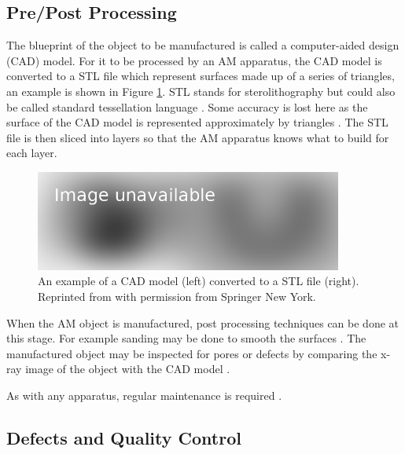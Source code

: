 \subsection{Pre/Post Processing}

The blueprint of the object to be manufactured is called a computer-aided design (CAD) model. For it to be processed by an AM apparatus, the CAD model is converted to a STL file \citep{3d1989sterolithography, 3d2019what} which represent surfaces made up of a series of triangles, an example is shown in Figure \ref{fig:literature_stl}. STL stands for sterolithography but could also be called standard tessellation language \citep{wong2012review}. Some accuracy is lost here as the surface of the CAD model is represented approximately by triangles \citep{gibson2010additive}. The STL file is then sliced into layers \citep{jamieson1995direct, vatani2009enhanced} so that the AM apparatus knows what to build for each layer.

\begin{figure}
  \centering
  \includegraphics[width=0.9\textwidth]{../figures/literatureReview/literature_stl.png}
  \caption{An example of a CAD model (left) converted to a STL file (right). Reprinted from \cite{gibson2010additive} with permission from Springer New York.}
  \label{fig:literature_stl}
\end{figure}

When the AM object is manufactured, post processing techniques can be done at this stage. For example sanding may be done to smooth the surfaces \citep{gibson2010additive}. The manufactured object may be inspected for pores or defects by comparing the x-ray image of the object with the CAD model \citep{lee2015compliance, villarraga2015assessing, kim2016inspection}.

As with any apparatus, regular maintenance is required \citep{bell2014maintaining}.

\subsection{Defects and Quality Control}

